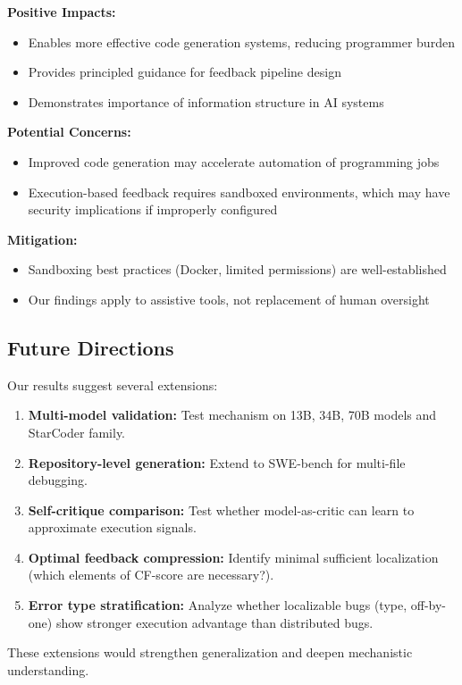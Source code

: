 \textbf{Positive Impacts:}
\begin{itemize}
\item Enables more effective code generation systems, reducing programmer burden
\item Provides principled guidance for feedback pipeline design
\item Demonstrates importance of information structure in AI systems
\end{itemize}

\textbf{Potential Concerns:}
\begin{itemize}
\item Improved code generation may accelerate automation of programming jobs
\item Execution-based feedback requires sandboxed environments, which may have security implications if improperly configured
\end{itemize}

\textbf{Mitigation:}
\begin{itemize}
\item Sandboxing best practices (Docker, limited permissions) are well-established
\item Our findings apply to assistive tools, not replacement of human oversight
\end{itemize}

\subsection{Future Directions}

Our results suggest several extensions:

\begin{enumerate}
\item \textbf{Multi-model validation:} Test mechanism on 13B, 34B, 70B models and StarCoder family.
\item \textbf{Repository-level generation:} Extend to SWE-bench for multi-file debugging.
\item \textbf{Self-critique comparison:} Test whether model-as-critic can learn to approximate execution signals.
\item \textbf{Optimal feedback compression:} Identify minimal sufficient localization (which elements of CF-score are necessary?).
\item \textbf{Error type stratification:} Analyze whether localizable bugs (type, off-by-one) show stronger execution advantage than distributed bugs.
\end{enumerate}

These extensions would strengthen generalization and deepen mechanistic understanding.
